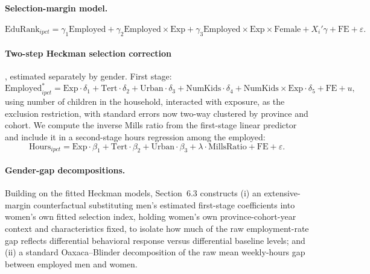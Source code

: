 \documentclass[11pt]{article}
\begin{document}
\paragraph{Selection-margin model.}
\begin{equation}
\text{EduRank}_{ipct} = \gamma_1 \text{Employed} + \gamma_2 \text{Employed}\times\text{Exp} + \gamma_3 \text{Employed}\times\text{Exp}\times\text{Female} + X_i'\gamma + \text{FE} + \varepsilon.
\end{equation}

\paragraph{Two-step Heckman selection correction}, estimated separately by gender. First stage:
\begin{equation}
\text{Employed}^*_{ipct} = \text{Exp}\cdot\delta_1 + \text{Tert}\cdot\delta_2 + \text{Urban}\cdot\delta_3 + \text{NumKids}\cdot\delta_4 + \text{NumKids}\times\text{Exp}\cdot\delta_5 + \text{FE} + u,
\end{equation}
using number of children in the household, interacted with exposure, as the exclusion restriction, with standard errors now two-way clustered by province and cohort. We compute the inverse Mills ratio from the first-stage linear predictor and include it in a second-stage hours regression among the employed:
\begin{equation}
\text{Hours}_{ipct} = \text{Exp}\cdot\beta_1 + \text{Tert}\cdot\beta_2 + \text{Urban}\cdot\beta_3 + \lambda \cdot \text{MillsRatio} + \text{FE} + \varepsilon.
\end{equation}

\paragraph{Gender-gap decompositions.} Building on the fitted Heckman models, Section~6.3 constructs (i) an extensive-margin counterfactual substituting men's estimated first-stage coefficients into women's own fitted selection index, holding women's own province-cohort-year context and characteristics fixed, to isolate how much of the raw employment-rate gap reflects differential behavioral response versus differential baseline levels; and (ii) a standard Oaxaca--Blinder decomposition of the raw mean weekly-hours gap between employed men and women.
\end{document}
